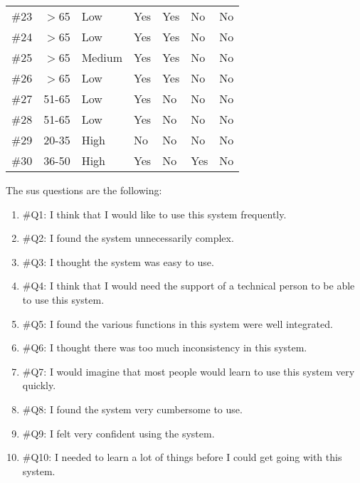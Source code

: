 \begin{table}
\begin{tabular}{r l l l l l l}
  \#23 & $>$65	& Low		& Yes	& Yes	& No	& No	\\
  \#24 & $>$65	& Low		& Yes	& Yes	& No	& No	\\
  \#25 & $>$65	& Medium	& Yes	& Yes	& No	& No	\\
  \#26 & $>$65	& Low		& Yes	& Yes	& No	& No	\\
  \#27 & 51-65 	& Low		& Yes	& No	& No	& No	\\
  \#28 & 51-65 	& Low		& Yes	& No	& No	& No	\\
  \#29 & 20-35 	& High		& No	& No	& No	& No	\\
  \#30 & 36-50 	& High		& Yes	& No	& Yes	& No	\\
  \hline
\end{tabular}
\end{table}

The \ac{sus} questions are the following:
\begin{enumerate}
  \item \#Q1: I think that I would like to use this system frequently.
  \item \#Q2: I found the system unnecessarily complex.
  \item \#Q3: I thought the system was easy to use.
  \item \#Q4: I think that I would need the support of a technical person to be 
  able to use this system.
  \item \#Q5: I found the various functions in this system were well integrated.
  \item \#Q6: I thought there was too much inconsistency in this system.
  \item \#Q7: I would imagine that most people would learn to use this system 
  very quickly.
  \item \#Q8: I found the system very cumbersome to use.
  \item \#Q9: I felt very confident using the system.
  \item \#Q10: I needed to learn a lot of things before I could get going with 
  this system.
\end{enumerate}

